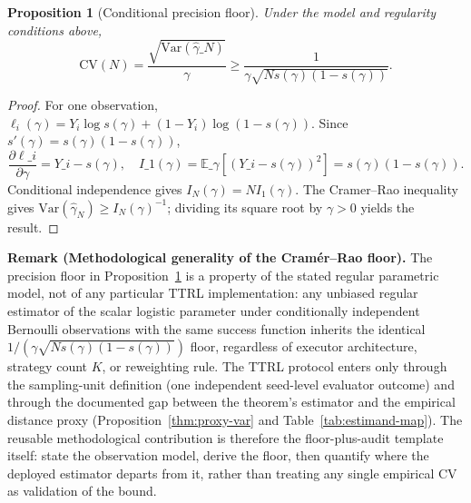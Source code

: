 \documentclass[11pt]{article}
\newtheorem{proposition}{Proposition}
\begin{document}
\begin{proposition}[Conditional precision floor]\label{thm:coupling-precision}
Under the model and regularity conditions above,
\[
\mathrm{CV}(N)=\frac{\sqrt{\mathrm{Var}(\hat\gamma\_N)}}{\gamma}
\geq \frac{1}{\gamma\sqrt{N s(\gamma)(1-s(\gamma))}}.
\]
\end{proposition}

\begin{proof}
For one observation, $\ell_i(\gamma)=Y_i\log s(\gamma)+(1-Y_i)\log(1-s(\gamma))$. Since $s'(\gamma)=s(\gamma)(1-s(\gamma))$,
\[
\frac{\partial\ell\_i}{\partial\gamma}=Y\_i-s(\gamma),
\quad I\_1(\gamma)=\mathbb{E}\_\gamma[(Y\_i-s(\gamma))^2]=s(\gamma)(1-s(\gamma)).
\]
Conditional independence gives $I_N(\gamma)=NI_1(\gamma)$. The Cramer--Rao inequality gives $\mathrm{Var}(\hat\gamma_N)\ge I_N(\gamma)^{-1}$; dividing its square root by $\gamma>0$ yields the result.
\end{proof}

\noindent\textbf{Remark (Methodological generality of the Cram\'er--Rao floor).}
The precision floor in Proposition~\ref{thm:coupling-precision} is a property of the stated regular parametric model, not of any particular TTRL implementation: any unbiased regular estimator of the scalar logistic parameter under conditionally independent Bernoulli observations with the same success function inherits the identical $1/(\gamma\sqrt{N s(\gamma)(1-s(\gamma))})$ floor, regardless of executor architecture, strategy count $K$, or reweighting rule. The TTRL protocol enters only through the sampling-unit definition (one independent seed-level evaluator outcome) and through the documented gap between the theorem's estimator and the empirical distance proxy (Proposition~\ref{thm:proxy-var} and Table~\ref{tab:estimand-map}). The reusable methodological contribution is therefore the floor-plus-audit template itself: state the observation model, derive the floor, then quantify where the deployed estimator departs from it, rather than treating any single empirical $\mathrm{CV}$ as validation of the bound.
\end{document}
